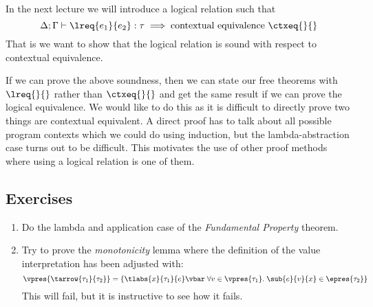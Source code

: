 In the next lecture we will introduce a logical relation such that
\[
  \Delta ; \Gamma \vdash \lreq{e_1}{e_2} : \tau \implies \text{contextual equivalence \ctxeq{}{}}
\]
That is we want to show that the logical relation is sound with respect to contextual equivalence.

If we can prove the above soundness, then we can state our free theorems with $\lreq{}{}$ rather than $\ctxeq{}{}$ and get the same result if we can prove the logical equivalence. We would like to do this as it is difficult to directly prove two things are contextual equivalent. A direct proof has to talk about all possible program contexts which we could do using induction, but the lambda-abstraction case turns out to be difficult. This motivates the use of other proof methods where using a logical relation is one of them.

\subsection*{Exercises}
\begin{enumerate}
\item Do the lambda and application case of the \emph{Fundamental Property} theorem.%
\item Try to prove the \emph{monotonicity} lemma where the definition of the value interpretation has been adjusted with:
\[
\vpres{\tarrow{\tau_1}{\tau_2}} = \{\tlabs{x}{\tau_1}{e} \vbar \; \forall v \in \vpres{\tau_1}. \; \sub{e}{v}{x} \in \epres{\tau_2} \}
\]
This will fail, but it is instructive to see how it fails.
\end{enumerate}


\clearpage
